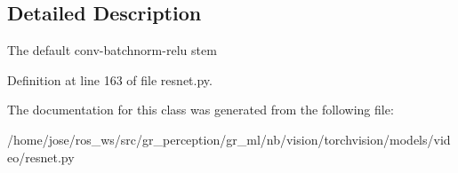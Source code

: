 \subsection{Detailed Description}
\begin{DoxyVerb}The default conv-batchnorm-relu stem
\end{DoxyVerb}
 

Definition at line 163 of file resnet.\+py.



The documentation for this class was generated from the following file\+:\begin{DoxyCompactItemize}
\item 
/home/jose/ros\+\_\+ws/src/gr\+\_\+perception/gr\+\_\+ml/nb/vision/torchvision/models/video/resnet.\+py\end{DoxyCompactItemize}
